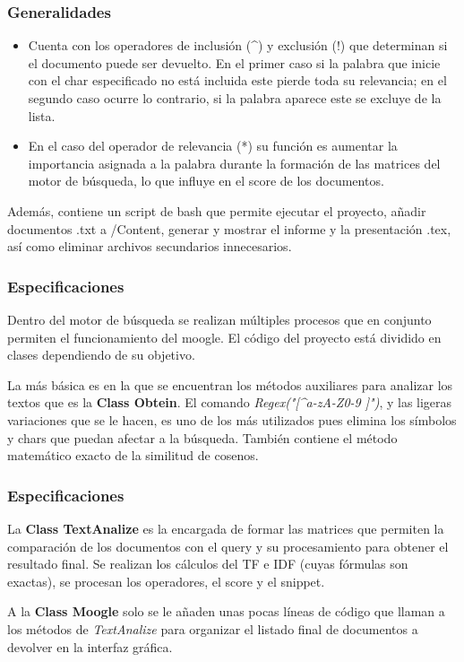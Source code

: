 \documentclass{beamer}
\begin{document}
\begin{frame}
    \frametitle{Generalidades}
    \begin{itemize}
        \item Cuenta con los operadores de inclusión (\^{}) y exclusión (!) que determinan si el documento puede ser 
        devuelto. En el primer caso si la palabra que inicie con el char especificado no está incluida este pierde 
        toda su relevancia; en el segundo caso ocurre lo contrario, si la palabra aparece este se excluye de la lista.
        \item En el caso del operador de relevancia (*) su función es aumentar la importancia asignada a la palabra 
        durante la formación de las matrices del motor de búsqueda, lo que influye en el score de los documentos.
    \end{itemize}

    Además, contiene un script de bash que permite ejecutar el proyecto, añadir documentos .txt a /Content, generar y 
    mostrar el informe y la presentación .tex, así como eliminar archivos secundarios innecesarios.
\end{frame}


\begin{frame}
    \frametitle{Especificaciones}
    Dentro del motor de búsqueda se realizan múltiples procesos que en conjunto permiten el funcionamiento del moogle.
    El código del proyecto está dividido en clases dependiendo de su objetivo. 
    
    La más básica es en la que se encuentran los métodos auxiliares para analizar los textos que es la 
    \textbf{Class Obtein}. El comando \textit{Regex("[\^{}a-zA-Z0-9 ]")}, y las ligeras variaciones que se le hacen, 
    es uno de los más utilizados pues elimina los símbolos y chars que puedan afectar a la búsqueda. También contiene 
    el método matemático exacto de la similitud de cosenos. 
\end{frame}

\begin{frame} 
    \frametitle{Especificaciones}
    La \textbf{Class TextAnalize} es la encargada de formar las matrices que permiten la comparación de los documentos
    con el query y su procesamiento para obtener el resultado final. Se realizan los cálculos del TF e IDF (cuyas 
    fórmulas son exactas), se procesan los operadores, el score y el snippet.

    A la \textbf{Class Moogle} solo se le añaden unas pocas líneas de código que llaman a los métodos de 
    \textit{TextAnalize} para organizar el listado final de documentos a devolver en la interfaz gráfica.
\end{frame}
\end{document}
